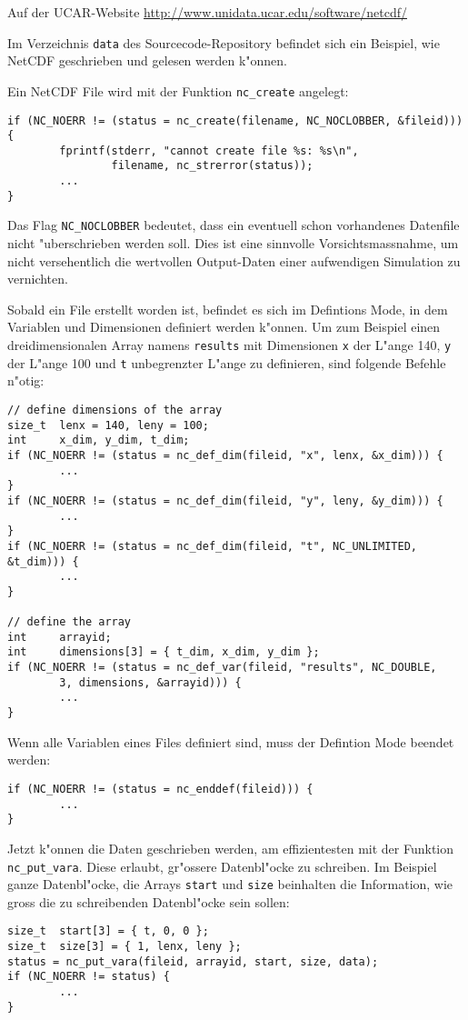 Auf der UCAR-Website \url{http://www.unidata.ucar.edu/software/netcdf/}

\begin{beispiel}
Im Verzeichnis {\tt data} des Sourcecode-Repository befindet sich
ein Beispiel, wie NetCDF geschrieben und gelesen werden k"onnen.

Ein NetCDF File wird mit der Funktion \verb+nc_create+ angelegt:
\begin{verbatim}
if (NC_NOERR != (status = nc_create(filename, NC_NOCLOBBER, &fileid))) {
        fprintf(stderr, "cannot create file %s: %s\n",
                filename, nc_strerror(status));
        ...
}
\end{verbatim}
Das Flag \verb+NC_NOCLOBBER+ bedeutet, dass ein eventuell schon vorhandenes
Datenfile nicht "uberschrieben werden soll.
Dies ist eine sinnvolle Vorsichtsmassnahme, um nicht versehentlich
die wertvollen Output-Daten einer aufwendigen Simulation zu vernichten.

Sobald ein File erstellt worden ist, befindet es sich im Defintions
Mode, in dem Variablen und Dimensionen definiert werden k"onnen.
Um zum Beispiel einen dreidimensionalen Array namens {\tt results}
mit Dimensionen {\tt x} der L"ange 140, {\tt y} der L"ange 100 und 
{\tt t} unbegrenzter L"ange zu definieren, sind folgende Befehle n"otig:
\begin{verbatim}
// define dimensions of the array
size_t  lenx = 140, leny = 100;
int     x_dim, y_dim, t_dim;
if (NC_NOERR != (status = nc_def_dim(fileid, "x", lenx, &x_dim))) {
        ...
}
if (NC_NOERR != (status = nc_def_dim(fileid, "y", leny, &y_dim))) {
        ...
}
if (NC_NOERR != (status = nc_def_dim(fileid, "t", NC_UNLIMITED, &t_dim))) {
        ...
}

// define the array
int     arrayid;
int     dimensions[3] = { t_dim, x_dim, y_dim };
if (NC_NOERR != (status = nc_def_var(fileid, "results", NC_DOUBLE,
        3, dimensions, &arrayid))) {
        ...
}
\end{verbatim}
Wenn alle Variablen eines Files definiert sind, muss der Defintion
Mode beendet werden:
\begin{verbatim}
if (NC_NOERR != (status = nc_enddef(fileid))) {
        ...
}
\end{verbatim}
Jetzt k"onnen die Daten geschrieben werden, am effizientesten mit der
Funktion \verb+nc_put_vara+. Diese erlaubt, gr"ossere Datenbl"ocke
zu schreiben.
Im Beispiel ganze Datenbl"ocke, die Arrays {\tt start} und {\tt size}
beinhalten die Information, wie gross die zu schreibenden Datenbl"ocke
sein sollen:
\begin{verbatim}
size_t  start[3] = { t, 0, 0 };
size_t  size[3] = { 1, lenx, leny };
status = nc_put_vara(fileid, arrayid, start, size, data);
if (NC_NOERR != status) {
        ...
}
\end{verbatim}
\end{beispiel}

